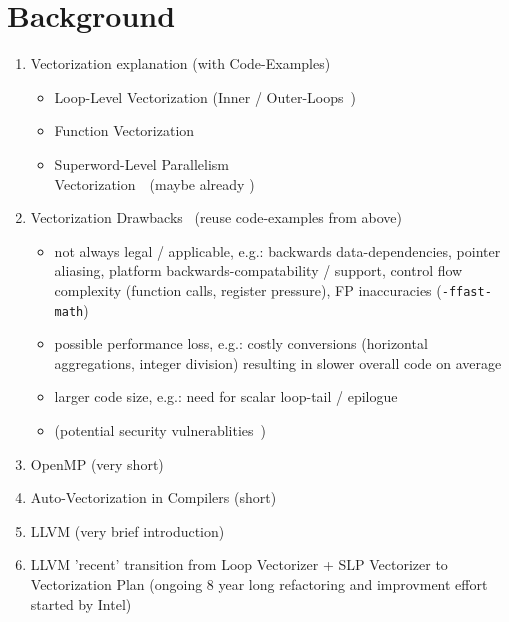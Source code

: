 \documentclass[sigplan,11pt,nonacm]{acmart}
\begin{document}
\section{Background}
\label{sec:background}
\begin{enumerate}
  \item Vectorization explanation (with Code\hyp{}Examples)
  \begin{itemize}
    \item Loop-Level Vectorization (Inner / Outer-Loops~\cite{llvmextloopvec,intelouterloop,10.5555/2337159.2337210,llvmouterloop,10.1145/1454115.1454119})
    \item Function Vectorization~\cite{llvmextloopvec}
    \item Superword-Level Parallelism\\Vectorization~\cite{10.1145/349299.349320}~(maybe already \cite{10.1145/3519939.3523701})
  \end{itemize}
  \item Vectorization Drawbacks~\cite{llvmveccontrolflow,intelvecessen} (reuse code\hyp{}examples from above)
  \begin{itemize}
    \item not always legal / applicable, e.g.: backwards data-dependencies, pointer aliasing, 
    platform backwards-compatability / support, control flow complexity (function calls, register pressure), FP inaccuracies (\texttt{-ffast-math})
    \item possible performance loss, e.g.: costly conversions (horizontal aggregations, integer division) resulting in slower overall code
    on average
    \item larger code size, e.g.: need for scalar loop-tail / epilogue
    \item (potential security vulnerablities~\cite{2023arXiv230201131K})
  \end{itemize}
  \item OpenMP (very short)
  \item Auto-Vectorization in Compilers (short)
  \item LLVM (very brief introduction)~\cite{10.5555/977395.977673}
  \item LLVM 'recent' transition from Loop Vectorizer + SLP Vectorizer to 
  Vectorization Plan (ongoing 8 year long refactoring and improvment 
  effort started by Intel)
\end{enumerate}


\end{document}
